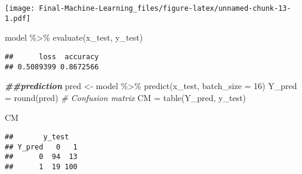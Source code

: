 \documentclass[
]{article}
\newenvironment{Shaded}{\begin{snugshade}}{\end{snugshade}}
\newcommand{\AttributeTok}[1]{\textcolor[rgb]{0.77,0.63,0.00}{#1}}
\newcommand{\CommentTok}[1]{\textcolor[rgb]{0.56,0.35,0.01}{\textit{#1}}}
\newcommand{\DecValTok}[1]{\textcolor[rgb]{0.00,0.00,0.81}{#1}}
\newcommand{\DocumentationTok}[1]{\textcolor[rgb]{0.56,0.35,0.01}{\textbf{\textit{#1}}}}
\newcommand{\FunctionTok}[1]{\textcolor[rgb]{0.00,0.00,0.00}{#1}}
\newcommand{\NormalTok}[1]{#1}
\newcommand{\OtherTok}[1]{\textcolor[rgb]{0.56,0.35,0.01}{#1}}
\newcommand{\SpecialCharTok}[1]{\textcolor[rgb]{0.00,0.00,0.00}{#1}}
\begin{document}
\texttt{[image: Final-Machine-Learning\_files/figure-latex/unnamed-chunk-13-1.pdf]}

\begin{Shaded}
\begin{Highlighting}[]
\NormalTok{model }\SpecialCharTok{\%\textgreater{}\%} 
  \FunctionTok{evaluate}\NormalTok{(x\_test,}
\NormalTok{           y\_test)}
\end{Highlighting}
\end{Shaded}

\begin{verbatim}
##      loss  accuracy 
## 0.5089399 0.8672566
\end{verbatim}

\begin{Shaded}
\begin{Highlighting}[]
\DocumentationTok{\#\#prediction }
\NormalTok{pred }\OtherTok{\textless{}{-}}\NormalTok{ model }\SpecialCharTok{\%\textgreater{}\%} \FunctionTok{predict}\NormalTok{(x\_test, }\AttributeTok{batch\_size =} \DecValTok{16}\NormalTok{)}
\NormalTok{Y\_pred }\OtherTok{=} \FunctionTok{round}\NormalTok{(pred)}
\CommentTok{\# Confusion matrix}
\NormalTok{CM }\OtherTok{=} \FunctionTok{table}\NormalTok{(Y\_pred, y\_test)}

\NormalTok{CM}
\end{Highlighting}
\end{Shaded}

\begin{verbatim}
##       y_test
## Y_pred   0   1
##      0  94  13
##      1  19 100
\end{verbatim}
\end{document}
